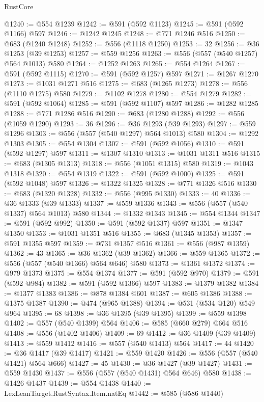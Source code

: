 \begin{lexlean}{RustCore}
\begin{coremodule}
@1240 := @554 @1239
@1242 := @591 (@592 @1123)
@1245 := @591 (@592 @1166) @597
@1246 := @1242 @1245
@1248 := @771 @1246 @516
@1250 := @683 (@1240 @1248)
@1252 := @556 (@1118 @1250)
@1253 := 32
@1256 := @36 @1253 (@39 @1253)
@1257 := @559 @1256
@1263 := @556 (@557 (@540 @1257) @564 @1013) @580
@1264 := @1252 @1263
@1265 := @554 @1264
@1267 := @591 (@592 @1115)
@1270 := @591 (@592 @1257) @597
@1271 := @1267 @1270
@1273 := @1031 @1271 @516
@1275 := @683 (@1265 @1273)
@1278 := @556 (@1110 @1275) @580
@1279 := @1102 @1278
@1280 := @554 @1279
@1282 := @591 (@592 @1064)
@1285 := @591 (@592 @1107) @597
@1286 := @1282 @1285
@1288 := @771 @1286 @516
@1290 := @683 (@1280 @1288)
@1292 := @556 (@1059 @1290)
@1293 := 36
@1296 := @36 @1293 (@39 @1293)
@1297 := @559 @1296
@1303 := @556 (@557 (@540 @1297) @564 @1013) @580
@1304 := @1292 @1303
@1305 := @554 @1304
@1307 := @591 (@592 @1056)
@1310 := @591 (@592 @1297) @597
@1311 := @1307 @1310
@1313 := @1031 @1311 @516
@1315 := @683 (@1305 @1313)
@1318 := @556 (@1051 @1315) @580
@1319 := @1043 @1318
@1320 := @554 @1319
@1322 := @591 (@592 @1000)
@1325 := @591 (@592 @1048) @597
@1326 := @1322 @1325
@1328 := @771 @1326 @516
@1330 := @683 (@1320 @1328)
@1332 := @556 (@995 @1330)
@1333 := 40
@1336 := @36 @1333 (@39 @1333)
@1337 := @559 @1336
@1343 := @556 (@557 (@540 @1337) @564 @1013) @580
@1344 := @1332 @1343
@1345 := @554 @1344
@1347 := @591 (@592 @992)
@1350 := @591 (@592 @1337) @597
@1351 := @1347 @1350
@1353 := @1031 @1351 @516
@1355 := @683 (@1345 @1353)
@1357 := @591 @1355 @597
@1359 := @731 @1357 @516
@1361 := @556 (@987 @1359)
@1362 := 43
@1365 := @36 @1362 (@39 @1362)
@1366 := @559 @1365
@1372 := @556 (@557 (@540 @1366) @564 @646) @580
@1373 := @1361 @1372
@1374 := @979 @1373
@1375 := @554 @1374
@1377 := @591 (@592 @970)
@1379 := @591 (@592 @984)
@1382 := @591 (@592 @1366) @597
@1383 := @1379 @1382
@1384 := @1377 @1383
@1386 := @878 @1384 @601
@1387 := @605 @1386
@1388 := @1375 @1387
@1390 := @474 (@965 @1388)
@1394 := @531 (@534 @120) @549 @964
@1395 := 68
@1398 := @36 @1395 (@39 @1395)
@1399 := @559 @1398
@1402 := @557 (@540 @1399) @564
@1406 := @585 (@660 @279) @664 @516
@1408 := @556 (@1402 @1406)
@1409 := 69
@1412 := @36 @1409 (@39 @1409)
@1413 := @559 @1412
@1416 := @557 (@540 @1413) @564
@1417 := 44
@1420 := @36 @1417 (@39 @1417)
@1421 := @559 @1420
@1426 := @556 (@557 (@540 @1421) @564 @666)
@1427 := 45
@1430 := @36 @1427 (@39 @1427)
@1431 := @559 @1430
@1437 := @556 (@557 (@540 @1431) @564 @646) @580
@1438 := @1426 @1437
@1439 := @554 @1438
@1440 := LexLeanTarget.RustSyntax.Item.natEq
@1442 := @585 (@586 @1440)

\end{coremodule}
\end{lexlean}
